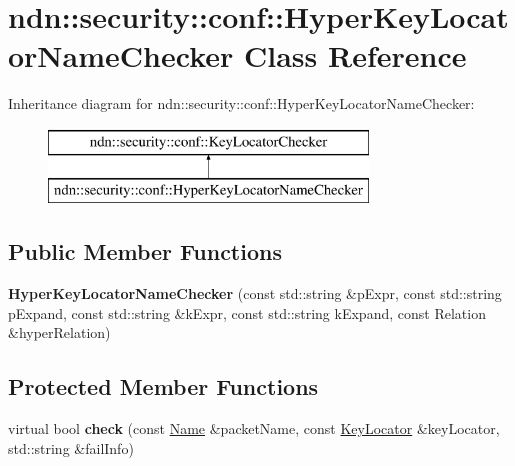 \hypertarget{classndn_1_1security_1_1conf_1_1HyperKeyLocatorNameChecker}{}\section{ndn\+:\+:security\+:\+:conf\+:\+:Hyper\+Key\+Locator\+Name\+Checker Class Reference}
\label{classndn_1_1security_1_1conf_1_1HyperKeyLocatorNameChecker}
Inheritance diagram for ndn\+:\+:security\+:\+:conf\+:\+:Hyper\+Key\+Locator\+Name\+Checker\+:\begin{figure}[H]
\begin{center}
\leavevmode
\includegraphics[height=2.000000cm]{classndn_1_1security_1_1conf_1_1HyperKeyLocatorNameChecker}
\end{center}
\end{figure}
\subsection*{Public Member Functions}
\begin{DoxyCompactItemize}
\item 
{\bfseries Hyper\+Key\+Locator\+Name\+Checker} (const std\+::string \&p\+Expr, const std\+::string p\+Expand, const std\+::string \&k\+Expr, const std\+::string k\+Expand, const Relation \&hyper\+Relation)\hypertarget{classndn_1_1security_1_1conf_1_1HyperKeyLocatorNameChecker_a2c8f8e13036d354133eb67e117ec7ea3}{}\label{classndn_1_1security_1_1conf_1_1HyperKeyLocatorNameChecker_a2c8f8e13036d354133eb67e117ec7ea3}

\end{DoxyCompactItemize}
\subsection*{Protected Member Functions}
\begin{DoxyCompactItemize}
\item 
virtual bool {\bfseries check} (const \hyperlink{classndn_1_1Name}{Name} \&packet\+Name, const \hyperlink{classndn_1_1KeyLocator}{Key\+Locator} \&key\+Locator, std\+::string \&fail\+Info)\hypertarget{classndn_1_1security_1_1conf_1_1HyperKeyLocatorNameChecker_a88bf7519690090f588f71913819fdd27}{}\label{classndn_1_1security_1_1conf_1_1HyperKeyLocatorNameChecker_a88bf7519690090f588f71913819fdd27}

\end{DoxyCompactItemize}
